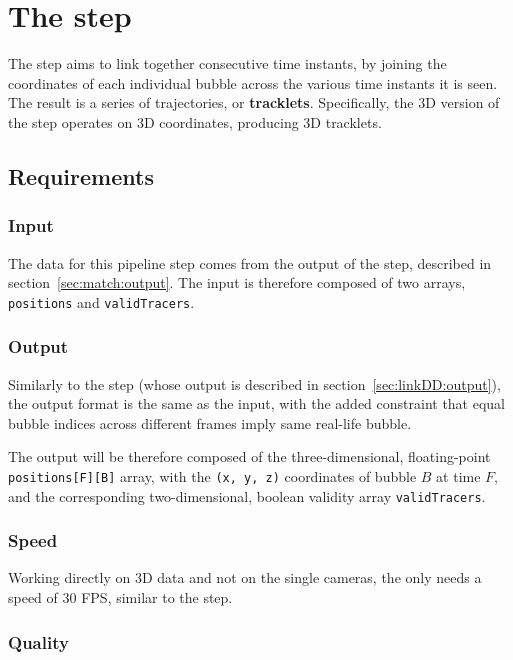 \chapter{The \linkDDD* step}
\label{chap:3dlink}

The \link* step aims to link together consecutive time instants, by joining the coordinates of each individual bubble across the various time instants it is seen.
The result is a series of trajectories, or \textbf{tracklets}.
Specifically, the 3D version of the \link* step operates on 3D coordinates, producing 3D tracklets.

\section{Requirements}

\subsection{Input}

The data for this pipeline step comes from the output of the \match* step, described in section~\ref{sec:match:output}.
The input is therefore composed of two arrays, \texttt{positions} and \texttt{validTracers}.

\subsection{Output}

Similarly to the \linkDD* step (whose output is described in section~\ref{sec:linkDD:output}), the output format is the same as the input, with the added constraint that equal bubble indices across different frames imply same real-life bubble.

The output will be therefore composed of the three-dimensional, floating-point \texttt{positions[F][B]} array, with the \texttt{(x, y, z)} coordinates of bubble $B$ at time $F$, and the corresponding two-dimensional, boolean validity array \texttt{validTracers}.

\subsection{Speed}

Working directly on 3D data and not on the single cameras, the \linkDDD* only needs a speed of 30 FPS, similar to the \match* step.

\subsection{Quality}

